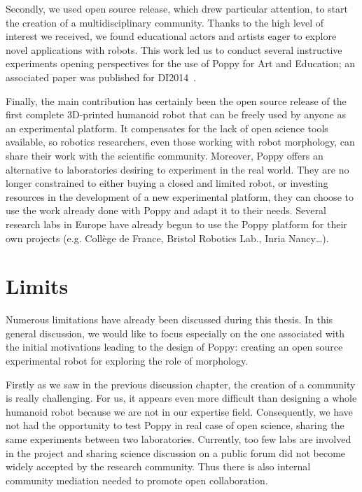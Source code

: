 Secondly, we used open source release, which drew particular attention, to start the creation of a multidisciplinary community. Thanks to the high level of interest we received, we found educational actors and artists eager to explore novel applications with robots. This work led us to conduct several instructive experiments opening perspectives for the use of Poppy for Art and Education; an associated paper was published for DI2014~\parencite{REF}.

Finally, the main contribution has certainly been the open source release of the first complete 3D-printed humanoid robot that can be freely used by anyone as an experimental platform. It compensates for the lack of open science tools available, so robotics researchers, even those working with robot morphology, can share their work with the scientific community. Moreover, Poppy offers an alternative to laboratories desiring to experiment in the real world. They are no longer constrained to either buying a closed and limited robot, or investing resources in the development of a new experimental platform, they can choose to use the work already done with Poppy and adapt it to their needs.
Several research labs in Europe have already begun to use the Poppy platform for their own projects (e.g. Collège de France, Bristol Robotics Lab., Inria Nancy…).




\section{Limits} %

Numerous limitations have already been discussed during this thesis. In this general discussion, we would like to focus especially on the one associated with the initial motivations leading to the design of Poppy: creating an open source experimental robot for exploring the role of morphology.

Firstly as we saw in the previous discussion chapter, the creation of a community is really challenging. For us, it appears even more difficult than designing a whole humanoid robot because we are not in our expertise field.
Consequently, we have not had the opportunity to test Poppy in real case of open science, sharing the same experiments between two laboratories. Currently, too few labs are involved in the project and sharing science discussion on a public forum did not become widely accepted by the research community. Thus there is also internal community mediation needed to promote open collaboration.

